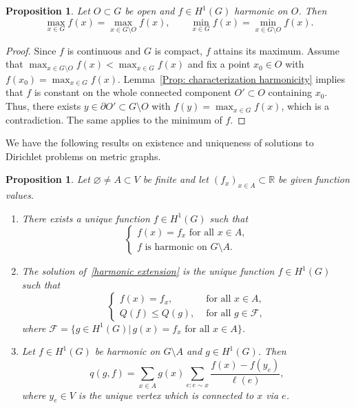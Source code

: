 \documentclass[reqno]{amsart}
\theoremstyle{plain}
\newtheorem{prop}[thm]{Proposition}
\theoremstyle{definition}
\theoremstyle{remark}
\numberwithin{equation}{section}
\newcommand{\R}{\mathbb{R}}     %
\begin{document}
\begin{prop}\label{Prop: Max and Min in harmonic functions}
	Let $O \subset G$ be open and $f \in H^1(G)$ harmonic on $O$. Then 
	\[
	\max_{x \in G} f(x) = \max_{x \in G\setminus O} f(x), \qquad \min_{x \in G} f(x) = \min_{x \in G\setminus O} f(x). 
	\] 
\end{prop}
\begin{proof}
	Since $f$ is continuous and $G$ is compact, $f$ attains its maximum. Assume that $\max_{x \in G\setminus O} f(x) <  \max_{x \in G} f(x)$ and fix a point $x_0 \in O$ with $f(x_0) = \max_{x \in G} f(x)$. Lemma~\ref{Prop: characterization harmonicity} implies that $f$ is constant on the whole connected component $O'\subset O$ containing $x_0$. Thus, there exists $y \in \partial O' \subset G \setminus O$ with $f(y)=\max_{x\in G} f(x)$, which is a contradiction. The same applies to the minimum of $f$. 
\end{proof} 



We have the following results on existence and uniqueness of solutions to Dirichlet problems on metric graphs.

\begin{prop} \label{Prop: Harmonic extension}
	Let $\varnothing \neq A \subset V$ be finite and let $(f_x)_{x \in A} \subset \R$ be given function values.
	\begin{enumerate}
		\item [(i)] \label{1:HarmonicExtension} There exists a unique function $f \in H^1(G)$ such that 
		\begin{equation} \label{harmonic extension}
			\begin{cases}
			f(x) = f_x \text{ for all } x \in A, \\
			f \text{ is harmonic on } G\setminus A. 
		\end{cases}
		\end{equation}
	
	\item [(ii)] \label{2:HarmonicExtension} The solution of~\eqref{harmonic extension} is the unique function $f \in H^1(G)$ such that
		\begin{equation} \label{harmonic extension minimum}
			\begin{cases}
			f(x) = f_x, & \text{ for all } x \in A, \\
			Q(f)\le Q(g), & \text{ for all }  g \in \mathcal{F},
			\end{cases}
		\end{equation}
	where $\mathcal{F} = \{g \in H^1(G)| \, g(x) = f_x \text{ for all } x \in A\}$. 
	\item [(iii)] \label{3:HarmonicExtension} Let $f\in H^1(G)$ be harmonic on $G \setminus A$ and $g \in H^1(G)$. Then 
	\begin{equation} \label{harmonic extension IBP}
	q(g,f) =  \sum_{x \in A}g(x) \sum_{e: e \sim x } \frac{f(x) - f(y_e)}{\ell(e)},
	\end{equation}
	where $y_e \in V$ is the unique vertex which is connected to $x$ via $e$.  
	\end{enumerate}
\end{prop}
\end{document}

